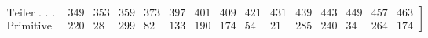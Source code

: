 \par\begingroup\small\setlength{\arraycolsep}{1.4pt}
\[\left.\begin{array}{l*{14}{r}}
\text{Teiler . . . . . } & 349 & 353 & 359 & 373 & 397 & 401 & 409 & 421 & 431 & 439 & 443 & 449 & 457 & 463\\
\text{Primitive Wurzel . .} & 220 & 28 & 299 & 82 & 133 & 190 & 174 & 54 & 21 & 285 & 240 & 34 & 264 & 174
\end{array}\right]\]
\endgroup

\par\endgroup

